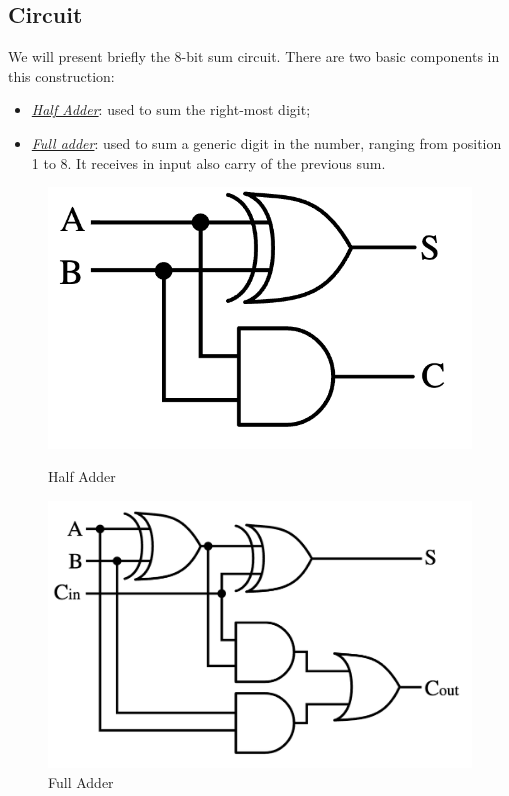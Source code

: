 \documentclass[12pt]{article}
\begin{document}
\subsection{Circuit}
We will present briefly the 8-bit sum circuit. There are two basic components in this construction:
\begin{itemize}
    \item \textit{\hyperref[half]{Half Adder}}: used to sum the right-most digit;
    \item \textit{\hyperref[full]{Full adder}}:  used to sum a generic digit in the number, ranging from position 1 to 8. It receives in input also carry of the previous sum.
\end{itemize}

\begin{figure}[!htb]
    \begin{minipage}{0.48\textwidth}
        \centering
        \includegraphics[width=.7\linewidth]{../src/images/Half_adder.png}
        \caption{Half Adder}\label{half}
    \end{minipage}
    \hfill
    \begin{minipage}{0.48\textwidth}
        \centering
        \includegraphics[width=.8\linewidth]{../src/images/Full-adder.png}
        \caption{Full Adder}\label{full}
    \end{minipage}
\end{figure}
\end{document}
